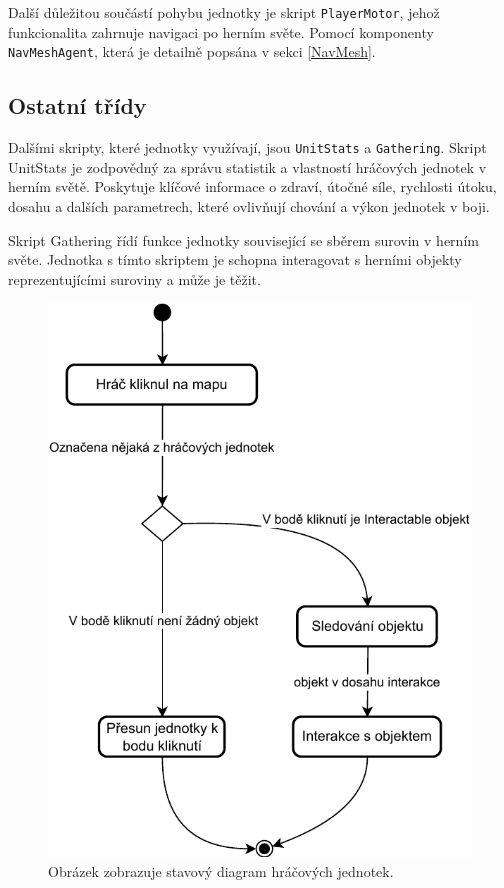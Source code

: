 Další důležitou součástí pohybu jednotky je skript \texttt{PlayerMotor}, jehož funkcionalita zahrnuje navigaci po herním světe. Pomocí komponenty \texttt{NavMeshAgent}, která je detailně popsána v sekci \ref{NavMesh}.

\subsection{Ostatní třídy}
Dalšími skripty, které jednotky využívají, jsou \texttt{UnitStats} a \texttt{Gathering}. Skript UnitStats je zodpovědný za správu statistik a vlastností hráčových jednotek v herním světě. Poskytuje klíčové informace o zdraví, útočné síle, rychlosti útoku, dosahu a dalších parametrech, které ovlivňují chování a výkon jednotek v boji. 

Skript Gathering řídí funkce jednotky související se sběrem surovin v herním světe. Jednotka s tímto skriptem je schopna interagovat s herními objekty reprezentujícími suroviny a může je těžit.

\begin{figure}[H]
	\centering
	\includegraphics[scale=1]{obrazky-figures/PlayerStateDiagram.pdf}
	\caption{Obrázek zobrazuje stavový diagram hráčových jednotek.}
	\label{UnitControlRelation}
\end{figure}

